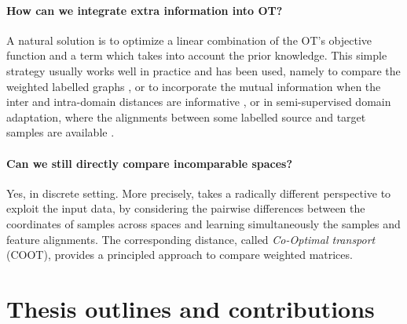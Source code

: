 \paragraph{How can we integrate extra information into OT?} A natural solution is to optimize
a linear combination of the OT's objective function and a term which takes into account the
prior knowledge. This simple strategy usually works well in practice and has been used, namely to
compare the weighted labelled graphs \citep{Vayer19b}, or to incorporate the mutual information
when the inter and intra-domain distances are informative \citep{Chuang23},
or in semi-supervised domain adaptation, where the alignments between some labelled source
and target samples are available \citep{Gu22}.


\paragraph{Can we still \textbf{directly} compare \textbf{incomparable spaces}?} Yes,
in discrete setting. More precisely, \citet{Redko20} takes a radically different perspective
to exploit the input data, by considering the pairwise differences between the coordinates
of samples across spaces and learning simultaneously the samples and feature alignments.
The corresponding distance, called \textit{Co-Optimal transport} (COOT),
provides a principled approach to compare weighted matrices.

\section{Thesis outlines and contributions}

